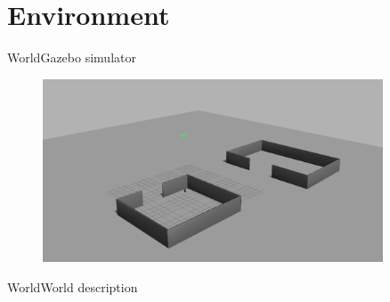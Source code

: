 \section{Environment}

\begin{frame}{World}{Gazebo simulator}

\begin{figure}
\centering
\includegraphics[width = 0.9\textwidth]{./screenshot/Gazebo.png}
\end{figure}

\end{frame}

\begin{frame}{World}{World description}

\end{frame}